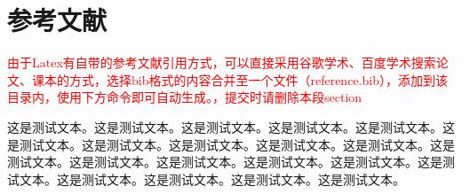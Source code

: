 \section{参考文献}
\textcolor{red}{由于Latex有自带的参考文献引用方式，可以直接采用谷歌学术、百度学术搜索论文、课本的方式，选择bib格式的内容合并至一个文件（reference.bib），添加到该目录内，使用下方命令即可自动生成。，提交时请删除本段section}


这是测试文本。这是测试文本。这是测试文本。这是测试文本。这是测试文本。这是测试文本。这是测试文本。这是测试文本。这是测试文本。这是测试文本。这是测试文本。这是测试文本。这是测试文本。这是测试文本。这是测试文本。这是测试文本。这是测试文本。这是测试文本。这是测试文本。这是测试文本。\cite{雷思磊2014自己动手写}


